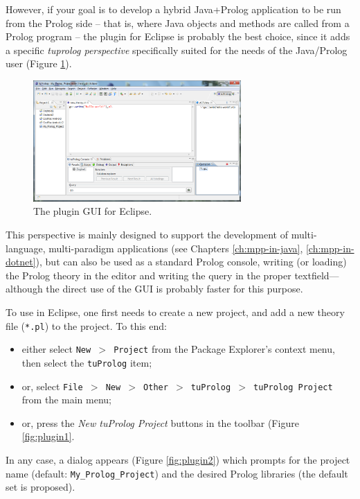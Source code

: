 However, if your goal is to develop a hybrid Java+Prolog application to be run from the Prolog side -- that is, where Java objects and methods are called from a Prolog program -- the \tuprolog{} plugin for Eclipse is probably the best choice, since it adds a specific \textit{tuprolog perspective} specifically suited for the needs of the Java/Prolog user (Figure \ref{fig:tuprologPluginGUI}).

\begin{figure}
  \includegraphics[width=300px]{images/tuprologPluginGUI.png}
  \caption{The \tuprolog{} plugin GUI for Eclipse.}\label{fig:tuprologPluginGUI}
\end{figure}

This perspective is mainly designed to support the development of multi-language, multi-paradigm applications (see Chapters \ref{ch:mpp-in-java}, \ref{ch:mpp-in-dotnet}), but can also be used as a standard Prolog console, writing (or loading) the Prolog theory in the editor and writing the query in the proper textfield---although the direct use of the \tuprolog{} GUI is probably faster for this purpose.

To use \tuprolog{} in Eclipse, one first needs to create a new \tuprolog{} project, and add a new theory file (\texttt{*.pl}) to the project.
%
To this end:%
\begin{itemize}
  \item either select \texttt{New $>$ Project} from the Package Explorer's context menu, then select the \texttt{tuProlog} item;
  \item or, select \texttt{File $>$ New $>$ Other $>$ tuProlog $>$ tuProlog Project} from the main menu;
  \item or, press the \textit{New tuProlog Project} buttons in the \tuprolog{} toolbar (Figure \ref{fig:plugin1}.
\end{itemize}

In any case, a dialog appears (Figure \ref{fig:plugin2}) which prompts for the project name (default: \texttt{My\_Prolog\_Project}) and the desired Prolog libraries (the default set is proposed).

